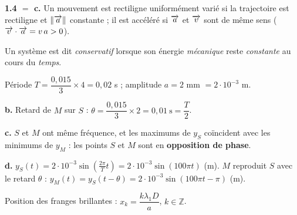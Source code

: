 \documentclass[11pt]{article}
\begin{document}
\textbf{1.4 $= $ c.} Un mouvement est rectiligne uniformément varié si la trajectoire est rectiligne et $\|\overrightarrow{a}\|$ constante ; il est accéléré si $\overrightarrow{a}$ et $\overrightarrow{v}$ sont de même sens ($\overrightarrow{v}\cdot\overrightarrow{a} = v\,a > 0$).

Un système est dit \emph{conservatif} lorsque son énergie \emph{mécanique} reste \emph{constante} au cours du \emph{temps}.


 Période $T = \dfrac{0{,}015}{3}\times 4 = 0{,}02$ s ; amplitude $a = 2$ mm $= 2\cdot10^{-3}$ m.

\textbf{b.} Retard de $M$ sur $S$ : $\theta = \dfrac{0{,}015}{3}\times 2 = 0{,}01\ \text{s} = \dfrac{T}{2}$.

\textbf{c.} $S$ et $M$ ont même fréquence, et les maximums de $y_S$ coïncident avec les minimums de $y_M$ : les points $S$ et $M$ sont en \textbf{opposition de phase}.

\textbf{d.} $y_S(t) = 2\cdot10^{-3}\sin\left(\frac{2\pi}{T}t\right) = 2\cdot10^{-3}\sin(100\pi t)$ (m). $M$ reproduit $S$ avec le retard $\theta$ : $y_M(t) = y_S(t - \theta) = 2\cdot10^{-3}\sin(100\pi t - \pi)$ (m).

\begin{center}
\end{center}

 Position des franges brillantes : $x_k = \dfrac{k\lambda_1 D}{a}$, $k \in \mathbb{Z}$.
\end{document}
